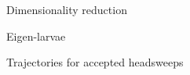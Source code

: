 \documentclass{beamer}
\begin{document}

\begin{frame}{Dimensionality reduction}
%
 \begin{center}
   
 \end{center}
%
\end{frame}


\begin{frame}{Eigen-larvae}
%
 \begin{center}
   
 \end{center}

%
\end{frame}


\begin{frame}{Trajectories for accepted headsweeps}
%
 \begin{center}
   
 \end{center}

%
\end{frame}


\end{document}
